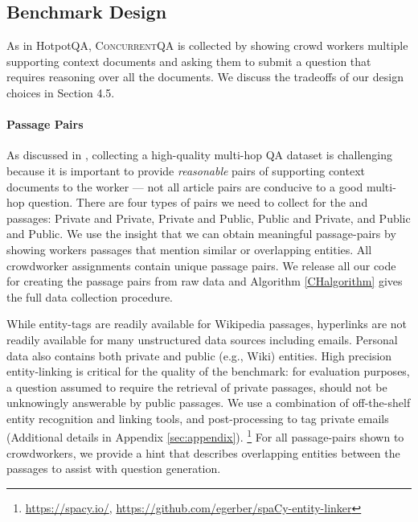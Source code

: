 \documentclass{article}
\newcommand{\datasetname}{\textsc{ConcurrentQA}\xspace}
\begin{document}
\subsection{Benchmark Design} 
As in HotpotQA, \datasetname is collected by showing crowd workers multiple supporting context documents and asking them to submit a question that requires reasoning over all the documents. 
We discuss the tradeoffs of our design choices in Section 4.5.

\paragraph{Passage Pairs}  As discussed in \citet{yang2018hotpotqa}, collecting a high-quality multi-hop QA dataset is challenging because it is important to provide \textit{reasonable} pairs of supporting context documents to the worker --- not all article pairs are conducive to a good multi-hop question. There are four types of pairs we need to collect for the  and  passages: Private and Private, Private and Public, Public and Private, and Public and Public.  We use the insight that we can obtain meaningful passage-pairs by showing workers passages that mention similar or overlapping entities. All crowdworker assignments contain unique passage pairs. We release all our code for creating the passage pairs from raw data and Algorithm \ref{CHalgorithm} gives the full data collection procedure.



While entity-tags are readily available for Wikipedia passages, hyperlinks are not readily available for many unstructured data sources including emails. Personal data also contains both private and public (e.g., Wiki) entities. High precision entity-linking is critical for the quality of the benchmark: for evaluation purposes, a question assumed to require the retrieval of private passages, should not be unknowingly answerable by public passages. We use a combination of off-the-shelf entity recognition and linking tools, and post-processing to tag private emails (Additional details in Appendix \ref{sec:appendix}). \footnote{\url{https://spacy.io/}, \url{https://github.com/egerber/spaCy-entity-linker}} For all passage-pairs shown to crowdworkers, we provide a hint that describes overlapping entities between the passages to assist with question generation.
\end{document}
